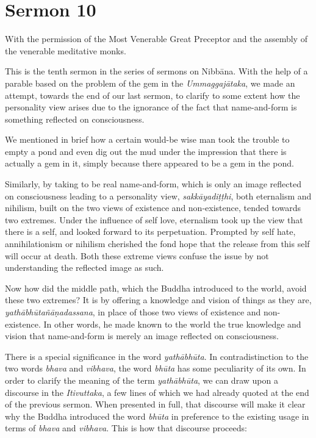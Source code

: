 \chapter{Sermon 10}

\NibbanaOpeningQuote

With the permission of the Most Venerable Great Preceptor and the assembly of the venerable meditative monks.

This is the tenth sermon in the series of sermons on Nibbāna. With the help of a parable based on the problem of the gem in the \emph{Ummaggajātaka}, we made an attempt, towards the end of our last sermon, to clarify to some extent how the personality view arises due to the ignorance of the fact that name-and-form is something reflected on consciousness.

We mentioned in brief how a certain would-be wise man took the trouble to empty a pond and even dig out the mud under the impression that there is actually a gem in it, simply because there appeared to be a gem in the pond.

Similarly, by taking to be real name-and-form, which is only an image reflected on consciousness leading to a personality view, \emph{sakkāyadiṭṭhi}, both eternalism and nihilism, built on the two views of existence and non-existence, tended towards two extremes. Under the influence of self love, eternalism took up the view that there is a self, and looked forward to its perpetuation. Prompted by self hate, annihilationism or nihilism cherished the fond hope that the release from this self will occur at death. Both these extreme views confuse the issue by not understanding the reflected image as such.

Now how did the middle path, which the Buddha introduced to the world, avoid these two extremes? It is by offering a knowledge and vision of things as they are, \emph{yathābhūtañāṇadassana}, in place of those two views of existence and non-existence. In other words, he made known to the world the true knowledge and vision that name-and-form is merely an image reflected on consciousness.

There is a special significance in the word \emph{yathābhūta}. In contradistinction to the two words \emph{bhava} and \emph{vibhava}, the word \emph{bhūta} has some peculiarity of its own. In order to clarify the meaning of the term \emph{yathābhūta}, we can draw upon a discourse in the \emph{Itivuttaka}, a few lines of which we had already quoted at the end of the previous sermon. When presented in full, that discourse will make it clear why the Buddha introduced the word \emph{bhūta} in preference to the existing usage in terms of \emph{bhava} and \emph{vibhava}. This is how that discourse proceeds:

